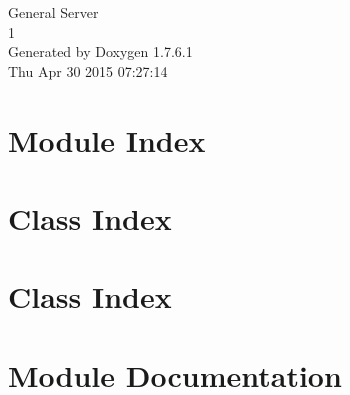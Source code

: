 \documentclass[a4paper]{book}
\begin{document}
\hypersetup{pageanchor=false,citecolor=blue}
\begin{titlepage}
\vspace*{7cm}
\begin{center}
{\Large \-General \-Server \\[1ex]\large 1 }\\
\vspace*{1cm}
{\large \-Generated by Doxygen 1.7.6.1}\\
\vspace*{0.5cm}
{\small Thu Apr 30 2015 07:27:14}\\
\end{center}
\end{titlepage}
\clearemptydoublepage
{}
\tableofcontents
\clearemptydoublepage
{}
\hypersetup{pageanchor=true,citecolor=blue}
\chapter{\-Module \-Index}

\chapter{\-Class \-Index}

\chapter{\-Class \-Index}

\chapter{\-Module \-Documentation}


\end{document}
